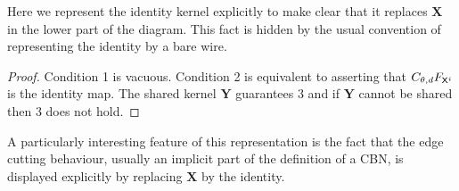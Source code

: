 Here we represent the identity kernel explicitly to make clear that it replaces $\mathbf{X}$ in the lower part of the diagram. This fact is hidden by the usual convention of representing the identity by a bare wire.

\begin{proof}
Condition 1 is vacuous. Condition 2 is equivalent to asserting that $C_{\theta,d} F_{\mathsf{X}^i}$ is the identity map. The shared kernel $\mathbf{Y}$ guarantees 3 and if $\mathbf{Y}$ cannot be shared then 3 does not hold.
\end{proof}

A particularly interesting feature of this representation is the fact that the edge cutting behaviour, usually an implicit part of the definition of a CBN, is displayed explicitly by replacing $\mathbf{X}$ by the identity. 






